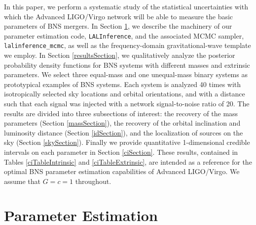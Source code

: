 \documentclass[11pt,a4paper]{emulateapj} 
\begin{document}
In this paper, we perform a systematic study of the statistical
uncertainties with which the Advanced LIGO/Virgo network will be able
to measure the basic parameters of BNS mergers.  In Section
\ref{PEsection}, we describe the machinery of our parameter estimation
code, \texttt{LALInference}, and the associated MCMC sampler,
\texttt{lalinference\_mcmc}, as well as the frequency-domain
gravitational-wave template we employ.  In Section
\ref{resultsSection}, we qualitatively analyze the posterior
probability density functions for BNS systems with different masses
and extrinsic parameters.  We select three equal-mass and one unequal-mass
 binary systems as prototypical examples of BNS systems.  Each system is analyzed 40 
 times with isotropically selected sky locations and orbital orientations, and with a distance
 such that each signal was injected with a network signal-to-noise ratio of 20.
  The results are divided into three subsections of interest: the recovery of the mass
parameters (Section \ref{massSection}), the recovery of the orbital
inclination and luminosity distance (Section \ref{idSection}), and the
localization of sources on the sky (Section \ref{skySection}).
Finally we provide quantitative 1-dimensional credible intervals on
each parameter in Section \ref{ciSection}.  These results, contained
in Tables \ref{ciTableIntrinsic} and \ref{ciTableExtrinsic}, are
intended as a reference for the optimal BNS parameter estimation
capabilities of Advanced LIGO/Virgo.  We assume that $G=c=1$
throughout.


\section{Parameter Estimation}
\label{PEsection}
\end{document}
